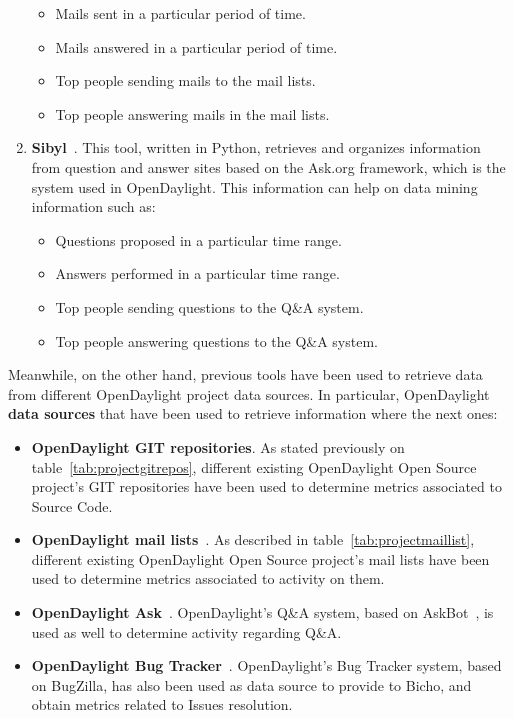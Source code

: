 \documentclass[a4paper, 12pt]{book}
\begin{document}
\begin{enumerate}
\begin{itemize}\itemsep0pt
\item{Mails sent in a particular period of time}.
\item{Mails answered in a particular period of time}.
\item{Top people sending mails to the mail lists}.
\item{Top people answering mails in the mail lists}.
\end{itemize}
\item{\textbf{Sibyl}~\cite{Sibyl}}. This tool, written in Python, retrieves and organizes information from question and answer sites based on the Ask.org framework, which is the system used in OpenDaylight. This information can help on data mining information such as:
\begin{itemize}\itemsep0pt
\item{Questions proposed in a particular time range}.
\item{Answers performed in a particular time range}.
\item{Top people sending questions to the Q\&A system}.
\item{Top people answering questions to the Q\&A system}.
\end{itemize}
\end{enumerate}
Meanwhile, on the other hand, previous tools have been used to retrieve data from different OpenDaylight project data sources. In particular, OpenDaylight \textbf{data sources} that have been used to retrieve information where the next ones:
\begin{itemize}\itemsep0pt
\item{\textbf{OpenDaylight GIT repositories}}. As stated previously on table~\ref{tab:projectgitrepos}, different existing OpenDaylight Open Source project's GIT repositories have been used to determine metrics associated to Source Code.
\item{\textbf{OpenDaylight mail lists}}~\cite{OpenDaylightMailLists}. As described in table~\ref{tab:projectmaillist}, different existing OpenDaylight Open Source project's mail lists have been used to determine metrics associated to activity on them.
\item{\textbf{OpenDaylight Ask}~\cite{OpenDaylightAsk}}. OpenDaylight's Q\&A system, based on AskBot~\cite{AskBot}, is used as well to determine activity regarding Q\&A.
\item{\textbf{OpenDaylight Bug Tracker}~\cite{OpenDaylightBugzilla}}. OpenDaylight's Bug Tracker system, based on BugZilla, has also been used as data source to provide to Bicho, and obtain metrics related to Issues resolution.
\end{itemize}
\end{document}
